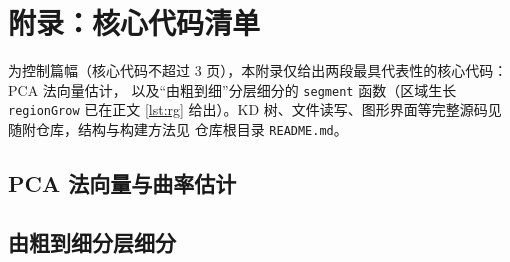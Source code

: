 
\section{附录：核心代码清单} \label{app:code}

为控制篇幅（核心代码不超过 3 页），本附录仅给出两段最具代表性的核心代码：PCA 法向量估计，
以及“由粗到细”分层细分的 \texttt{segment} 函数（区域生长 \texttt{regionGrow} 已在正文
\autoref{lst:rg} 给出）。KD 树、文件读写、图形界面等完整源码见随附仓库，结构与构建方法见
仓库根目录 \texttt{README.md}。

\subsection{PCA 法向量与曲率估计}


\subsection{由粗到细分层细分}

